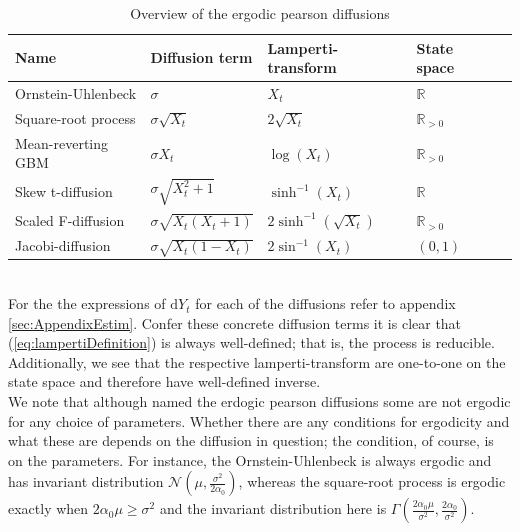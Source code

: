\begin{table}[h!]
    \begin{center}
    \begin{tabular}{lllll}\hline
    \textbf{Name} & \textbf{Diffusion term} & \textbf{Lamperti-transform} & \textbf{State space}\\ \hline
    Ornstein-Uhlenbeck  & $\sigma$  & $X_t$ & $\mathbb{R}$ \\
    Square-root process & $\sigma\sqrt{X_t}$  & $ 2\sqrt{X_t}$ & $\mathbb{R}_{>0}$ \\
    Mean-reverting GBM  & $\sigma X_t $  & $ \log\left(X_t\right)$  & $\mathbb{R}_{>0}$ \\
    Skew t-diffusion  & $\sigma\sqrt{X_t^2 + 1}$  & $ \sinh^{-1}(X_t)$ & $\mathbb{R}$\\
    Scaled F-diffusion  & $\sigma\sqrt{X_t\left(X_t + 1\right)}$  & $ 2\sinh^{-1}\left(\sqrt{X_t}\right)$ & $\mathbb{R}_{>0}$ \\
    Jacobi-diffusion  & $\sigma\sqrt{X_t\left(1 - X_t\right)}$  & $ 2\sin^{-1}\left(X_t\right)$ & $(0, 1)$ \\ \hline
    \end{tabular}
    \caption{Overview of the ergodic pearson diffusions}
    \label{table:ergodicDiffusions}
\end{center}
\end{table}\\
For the the expressions of $\mathrm{d}Y_t$ for each of the diffusions refer to appendix \ref{sec:AppendixEstim}. Confer these concrete diffusion terms it is clear that (\ref{eq:lampertiDefinition}) is always well-defined; that is, the process is reducible. Additionally, we see that the respective lamperti-transform are one-to-one on the state space and therefore have well-defined inverse. \\
We note that although named the erdogic pearson diffusions some are not ergodic for any choice of parameters. Whether there are any conditions for ergodicity and what these are depends on the diffusion in question; the condition, of course, is on the parameters. For instance, the Ornstein-Uhlenbeck is always ergodic and has invariant distribution $\mathcal{N}\left(\mu, \frac{\sigma^2}{2\alpha_0}\right)$, whereas the square-root process is ergodic exactly when $2\alpha_0\mu\geq \sigma^2$ and the invariant distribution here is $\Gamma\left(\frac{2\alpha_0\mu}{\sigma^2}, \frac{2\alpha_0}{\sigma^2}\right)$. \\
